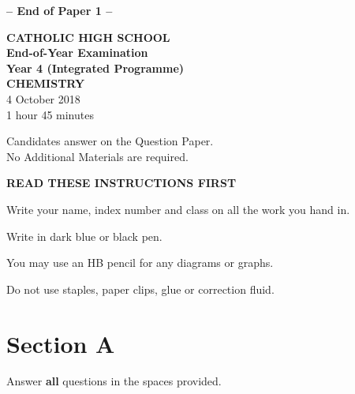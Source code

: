 \documentclass[11pt]{exam}
\begin{document}
\vfill
\begin{center}
\textbf{-- End of Paper 1 --}
\end{center}

\newpage


\begin{center}
{\Large \textbf{CATHOLIC HIGH SCHOOL}} \\
\vspace{0.5em}
{\Large \textbf{End-of-Year Examination}} \\
{\Large \textbf{Year 4 (Integrated Programme)}} \\
{\Large \textbf{CHEMISTRY}} \\
\vspace{0.5em}
{\large 4 October 2018} \\
{\large 1 hour 45 minutes} \\
\end{center}

\vspace{0.5em}
Candidates answer on the Question Paper. \\
No Additional Materials are required.

\vspace{0.5em}
{\bf READ THESE INSTRUCTIONS FIRST}

Write your name, index number and class on all the work you hand in.

Write in dark blue or black pen.

You may use an HB pencil for any diagrams or graphs.

Do not use staples, paper clips, glue or correction fluid.

\vspace{1em}

\section*{Section A}

Answer \textbf{all} questions in the spaces provided.

\vspace{1em}
\end{document}
